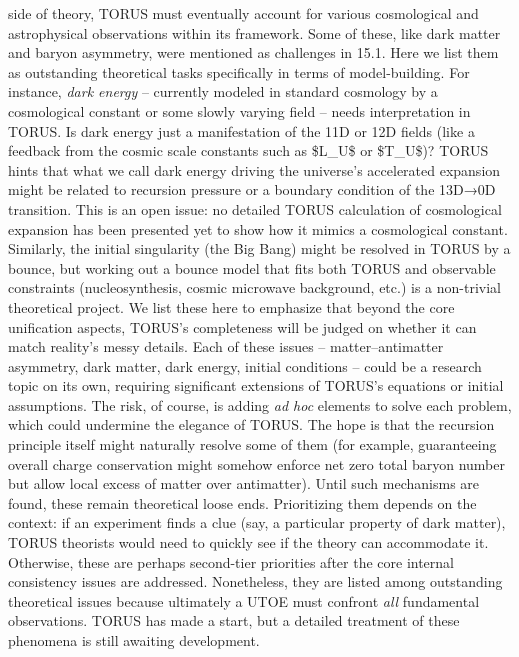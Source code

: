 \documentclass[]{article}
\begin{document}
\begin{itemize}
  side of theory, TORUS must eventually account for various cosmological
  and astrophysical observations within its framework. Some of these,
  like dark matter and baryon asymmetry, were mentioned as challenges in
  15.1. Here we list them as outstanding theoretical tasks specifically
  in terms of model-building. For instance, \emph{dark energy} --
  currently modeled in standard cosmology by a cosmological constant or
  some slowly varying field -- needs interpretation in TORUS. Is dark
  energy just a manifestation of the 11D or 12D fields (like a feedback
  from the cosmic scale constants such as \$L\_U\$ or \$T\_U\$)? TORUS
  hints that what we call dark energy driving the universe's accelerated
  expansion might be related to recursion pressure or a boundary
  condition of the 13D→0D transition. This is an open issue: no detailed
  TORUS calculation of cosmological expansion has been presented yet to
  show how it mimics a cosmological constant. Similarly, the initial
  singularity (the Big Bang) might be resolved in TORUS by a bounce, but
  working out a bounce model that fits both TORUS and observable
  constraints (nucleosynthesis, cosmic microwave background, etc.) is a
  non-trivial theoretical project. We list these here to emphasize that
  beyond the core unification aspects, TORUS's completeness will be
  judged on whether it can match reality's messy details. Each of these
  issues -- matter--antimatter asymmetry, dark matter, dark energy,
  initial conditions -- could be a research topic on its own, requiring
  significant extensions of TORUS's equations or initial assumptions.
  The risk, of course, is adding \emph{ad hoc} elements to solve each
  problem, which could undermine the elegance of TORUS. The hope is that
  the recursion principle itself might naturally resolve some of them
  (for example, guaranteeing overall charge conservation might somehow
  enforce net zero total baryon number but allow local excess of matter
  over antimatter). Until such mechanisms are found, these remain
  theoretical loose ends. Prioritizing them depends on the context: if
  an experiment finds a clue (say, a particular property of dark
  matter), TORUS theorists would need to quickly see if the theory can
  accommodate it. Otherwise, these are perhaps second-tier priorities
  after the core internal consistency issues are addressed. Nonetheless,
  they are listed among outstanding theoretical issues because
  ultimately a UTOE must confront \emph{all} fundamental observations.
  TORUS has made a start, but a detailed treatment of these phenomena is
  still awaiting development.
\end{itemize}
\end{document}
